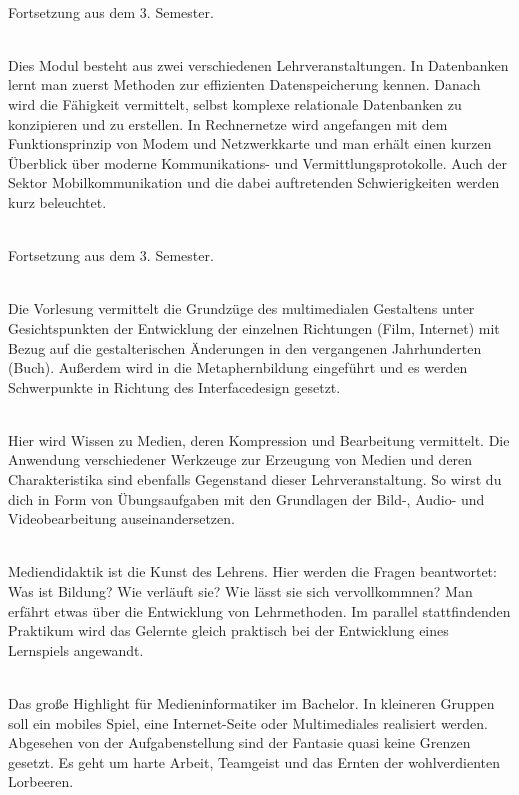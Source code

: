 \textbf{} \\
Fortsetzung aus dem 3. Semester.

\textbf{} \\
Dies Modul besteht aus zwei verschiedenen Lehrveranstaltungen.
In Datenbanken lernt man zuerst Methoden zur effizienten Datenspeicherung kennen.
Danach wird die Fähigkeit vermittelt, selbst komplexe relationale Datenbanken zu konzipieren und zu erstellen.
In Rechnernetze wird angefangen mit dem Funktionsprinzip von Modem und Netzwerkkarte und man erhält einen kurzen Überblick über moderne Kommunikations- und Vermittlungsprotokolle.
Auch der Sektor Mobilkommunikation und die dabei auftretenden Schwierigkeiten werden kurz beleuchtet.

\textbf{} \\
Fortsetzung aus dem 3. Semester.

\textbf{} \\
Die Vorlesung vermittelt die Grundzüge des multimedialen Gestaltens unter Gesichtspunkten der Entwicklung der einzelnen Richtungen (Film, Internet) mit Bezug auf die gestalterischen Änderungen in den vergangenen Jahrhunderten (Buch).
Außerdem wird in die Metaphernbildung eingeführt und es werden Schwerpunkte in Richtung des Interfacedesign gesetzt.

\textbf{} \\
Hier wird Wissen zu Medien, deren Kompression und Bearbeitung vermittelt.
Die Anwendung verschiedener Werkzeuge zur Erzeugung von Medien und deren Charakteristika sind ebenfalls Gegenstand dieser Lehrveranstaltung.
So wirst du dich in Form von Übungsaufgaben mit den Grundlagen der Bild-, Audio- und Videobearbeitung auseinandersetzen.

\textbf{} \\
Mediendidaktik ist die \glqq Kunst des Lehrens\grqq.
Hier werden die Fragen beantwortet:
Was ist Bildung?
Wie verläuft sie?
Wie lässt sie sich vervollkommnen?
Man erfährt etwas über die Entwicklung von Lehrmethoden.
Im parallel stattfindenden Praktikum wird das Gelernte gleich praktisch bei der Entwicklung eines Lernspiels angewandt.

\textbf{} \\
Das große Highlight für Medieninformatiker im Bachelor.
In kleineren Gruppen soll ein mobiles Spiel, eine Internet-Seite oder Multimediales realisiert werden.
Abgesehen von der Aufgabenstellung sind der Fantasie quasi keine Grenzen gesetzt.
Es geht um harte Arbeit, Teamgeist und das Ernten der wohlverdienten Lorbeeren.


